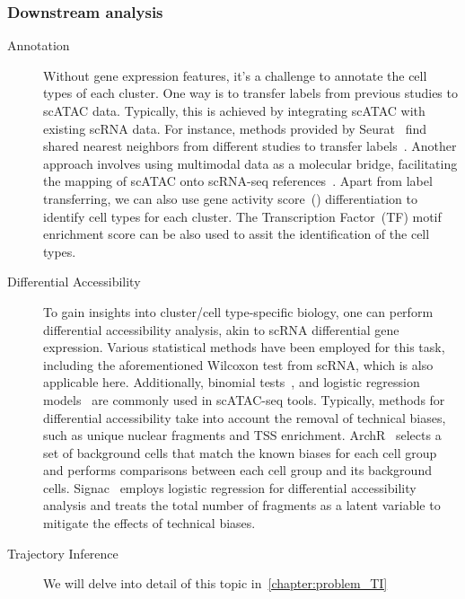 \subsubsection{Downstream analysis}
\label{background:sec2:atac_downstream}
\begin{description}

	\item[Annotation]
	Without gene expression features, it's a challenge to annotate the cell types of each cluster. One way is to transfer labels from previous studies to scATAC data. Typically, this is achieved by integrating scATAC with existing scRNA data. For instance, methods provided by Seurat~\citep{stuart2019seurat3} find shared nearest neighbors from different studies to transfer labels~\citep{stuart2019seurat3}. Another approach involves using multimodal data as a molecular bridge, facilitating the mapping of scATAC onto scRNA-seq references~\citep{hao2023dictionary}. Apart from label transferring, we can also use gene activity score~() differentiation to identify cell types for each cluster. The Transcription Factor~(TF) motif enrichment score can be also used to assit the identification of the cell types.

	\item[Differential Accessibility]
	To gain insights into cluster/cell type-specific biology, one can perform differential accessibility analysis, akin to scRNA differential gene expression. Various statistical methods have been employed for this task, including the aforementioned Wilcoxon test from scRNA, which is also applicable here. Additionally, binomial tests~\citep{cusanovich2018single}, and logistic regression models~\citep{hao2021seurat4} are commonly used in scATAC-seq tools. Typically, methods for differential accessibility take into account the removal of technical biases, such as unique nuclear fragments and TSS enrichment. ArchR~\citep{Granja2021} selects a set of background cells that match the known biases for each cell group and performs comparisons between each cell group and its background cells. Signac~\citep{hao2021seurat4} employs logistic regression for differential accessibility analysis and treats the total number of fragments as a latent variable to mitigate the effects of technical biases.

	\item[Trajectory Inference]
	We will delve into detail of this topic in~\cref{chapter:problem_TI}



\end{description}
